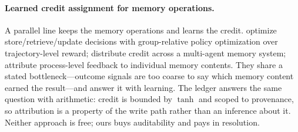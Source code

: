 \paragraph{Learned credit assignment for memory operations.}
A parallel line keeps the memory operations and learns the credit.
\citet{memoryr2} optimize store/retrieve/update decisions with
group-relative policy optimization over trajectory-level reward;
\citet{treecredit2026} distribute credit across a multi-agent memory
system; \citet{attrimem2026} attribute process-level feedback to
individual memory contents. They share a stated bottleneck---outcome
signals are too coarse to say which memory content earned the result---and
answer it with learning. The ledger answers the same question with
arithmetic: credit is bounded by $\tanh$ and scoped to provenance, so
attribution is a property of the write path rather than an inference
about it. Neither approach is free; ours buys auditability and pays in
resolution.

